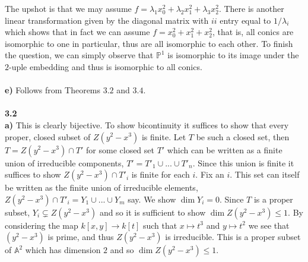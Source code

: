 \documentclass[12pt]{article}
\numberwithin{thm}{subsection}
\numberwithin{defn}{subsection}
\numberwithin{lemma}{subsection}
\numberwithin{example}{subsection}
\numberwithin{notation}{subsection}
\numberwithin{cor}{subsection}
\numberwithin{remark}{subsection}
\numberwithin{condition}{subsection}
\numberwithin{question}{subsection}
\numberwithin{construction}{subsection}
\numberwithin{construction}{subsection}
\numberwithin{construction}{subsection}
\newcommand{\bb}[1]{\mathbb{#1}}
\begin{document}
The upshot is that we may assume $f = \lambda_1 x_0^2 + \lambda_2 x_1^2 + \lambda_3 x_2^2$. There is another linear transformation given by the diagonal matrix with $ii$ entry equal to $1/\lambda_i$ which shows that in fact we can assume $f = x_0^2 + x_1^2 + x_2^2$, that is, all conics are isomorphic to one in particular, thus are all isomorphic to each other. To finish the question, we can simply observe that $\bb{P}^1$ is isomorphic to its image under the $2$-uple embedding and thus is isomorphic to all conics.\\\\
%
\textbf{e)} Follows from Theorems $3.2$ and $3.4$.\\\\
%
\textbf{3.2}\\
\textbf{a)} This is clearly bijective. To show bicontinuity it suffices to show that every proper, closed subset of $Z(y^2 - x^3)$ is finite. Let $T$ be such a closed set, then $T = Z(y^2 - x^3) \cap T'$ for some closed set $T'$ which can be written as a finite union of irreducible components, $T' = T'_1 \cup ... \cup T'_n$. Since this union is finite it suffices to show $Z(y^2 - x^3) \cap T'_i$ is finite for each $i$. Fix an $i$. This set can itself be written as the finite union of irreducible elements, $Z(y^2 - x^3) \cap T'_i = Y_1 \cup ... \cup Y_m$ say. We show $\operatorname{dim}Y_i = 0$. Since $T$ is a proper subset, $Y_i \subsetneq Z(y^2 - x^3)$ and so it is sufficient to show $\operatorname{dim}Z(y^2 - x^3) \leq 1$. By considering the map $k[x,y] \to k[t]$ such that $x \mapsto t^3$ and $y \mapsto t^2$ we see that $(y^2 - x^3)$ is prime, and thus $Z(y^2 - x^3)$ is irreducible. This is a proper subset of $\bb{A}^2$ which has dimension $2$ and so $\operatorname{dim}Z(y^2 - x^3) \leq 1$.\\
\end{document}
